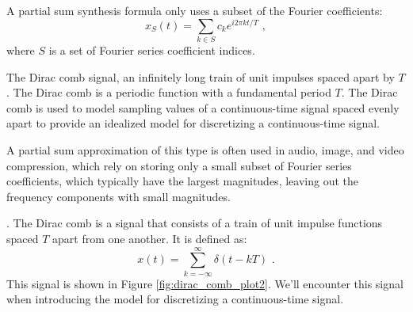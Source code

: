 A partial sum synthesis formula only uses a subset of the Fourier coefficients:
\begin{equation}
x_S(t) = \sum_{k \in S} c_k e^{i 2\pi kt/T} \,\,,
\end{equation}
where $S$ is a set of Fourier series coefficient indices.

\begin{marginfigure}
\begin{center}
\end{center}
\caption{The Dirac comb signal, an infinitely long train of unit impulses spaced apart by $T$. The Dirac comb is a periodic function with a fundamental period $T$. The Dirac comb is used to model sampling values of a continuous-time signal spaced evenly apart to provide an idealized model for discretizing a continuous-time signal.}
\label{fig:dirac_comb_plot2}
\end{marginfigure}

A partial sum approximation of this type is often used in audio, image, and video compression, which rely on storing only a small subset of Fourier series coefficients, which typically have the largest magnitudes, leaving out the frequency components with small magnitudes.

.
The Dirac comb is a signal that consists of a train of unit impulse functions spaced $T$ apart from one another. It is defined as:
\begin{equation}
x(t) = \sum_{k=-\infty}^{\infty} \delta(t - k T) \,\,.
\end{equation}
This signal is shown in Figure \ref{fig:dirac_comb_plot2}. We'll encounter this signal when introducing the model for discretizing a continuous-time signal. 

